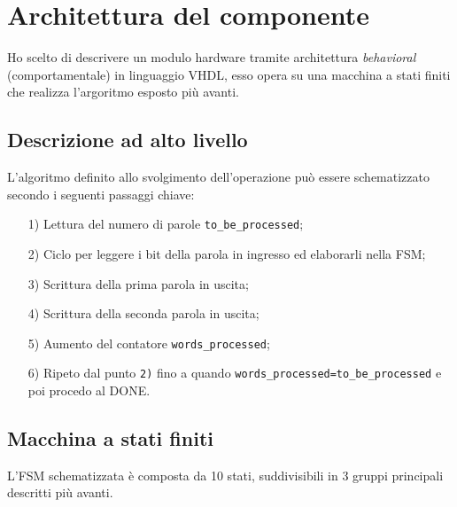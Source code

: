 \documentclass{article}
\begin{document}
\pagebreak

\section{Architettura del componente} %
Ho scelto di descrivere un modulo hardware tramite architettura \emph{behavioral} (comportamentale) in linguaggio VHDL, esso opera su una macchina a stati finiti che realizza l'argoritmo esposto più avanti.
\vspace{0,2cm}
\subsection{Descrizione ad alto livello}
L'algoritmo definito allo svolgimento dell’operazione può essere schematizzato secondo i seguenti passaggi chiave:
\begin{itemize}
    \item   [1)]    Lettura del numero di parole \texttt{to\_be\_processed};
    \item   [2)]    Ciclo per leggere i bit della parola in ingresso ed elaborarli nella FSM;
    \item   [3)]    Scrittura della prima parola in uscita;
    \item   [4)]    Scrittura della seconda parola in uscita;
    \item   [5)]    Aumento del contatore \texttt{words\_processed};
    \item   [6)]    Ripeto dal punto \texttt{2)} fino a quando \texttt{words\_processed=to\_be\_processed} e poi procedo al DONE.
\end{itemize}

\subsection{Macchina a stati finiti} %
L’FSM schematizzata è composta da 10 stati, suddivisibili in 3 gruppi principali descritti più avanti.
\end{document}
